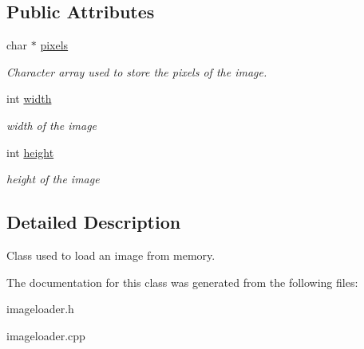 \subsection*{Public Attributes}
\begin{DoxyCompactItemize}
\item 
\hypertarget{class_image_a6afbcf4b0a2774f020ce350bff9d0d6c}{char $\ast$ \hyperlink{class_image_a6afbcf4b0a2774f020ce350bff9d0d6c}{pixels}}\label{class_image_a6afbcf4b0a2774f020ce350bff9d0d6c}

\begin{DoxyCompactList}\small\item\em Character array used to store the pixels of the image. \end{DoxyCompactList}\item 
\hypertarget{class_image_ab8d12f635013c04159cd4d3d972bac88}{int \hyperlink{class_image_ab8d12f635013c04159cd4d3d972bac88}{width}}\label{class_image_ab8d12f635013c04159cd4d3d972bac88}

\begin{DoxyCompactList}\small\item\em width of the image \end{DoxyCompactList}\item 
\hypertarget{class_image_a51df43db420c9c0b57536cb2dd36de5c}{int \hyperlink{class_image_a51df43db420c9c0b57536cb2dd36de5c}{height}}\label{class_image_a51df43db420c9c0b57536cb2dd36de5c}

\begin{DoxyCompactList}\small\item\em height of the image \end{DoxyCompactList}\end{DoxyCompactItemize}


\subsection{Detailed Description}
Class used to load an image from memory. 

The documentation for this class was generated from the following files\-:\begin{DoxyCompactItemize}
\item 
imageloader.\-h\item 
imageloader.\-cpp\end{DoxyCompactItemize}
